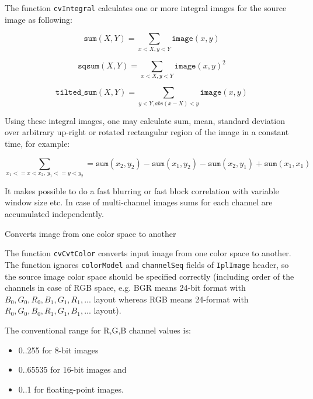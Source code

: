 The function \texttt{cvIntegral} calculates one or more integral images for the source image as following:

\[
\texttt{sum}(X,Y) = \sum_{x<X,y<Y} \texttt{image}(x,y)
\]

\[
\texttt{sqsum}(X,Y) = \sum_{x<X,y<Y} \texttt{image}(x,y)^2
\]

\[
\texttt{tilted\_sum}(X,Y) = \sum_{y<Y,abs(x-X)<y} \texttt{image}(x,y)
\]

Using these integral images, one may calculate sum, mean, standard deviation over arbitrary up-right or rotated rectangular region of the image in a constant time, for example:

\[
\sum_{x_1<=x<x_2, \, y_1<=y<y_2} = \texttt{sum}(x_2,y_2)-\texttt{sum}(x_1,y_2)-\texttt{sum}(x_2,y_1)+\texttt{sum}(x_1,x_1)
\]

It makes possible to do a fast blurring or fast block correlation with variable window size etc. In case of multi-channel images sums for each channel are accumulated independently.

\label{CvtColor}

Converts image from one color space to another


\begin{description}
\end{description}

The function \texttt{cvCvtColor} converts input image from one color
space to another. The function ignores \texttt{colorModel} and
\texttt{channelSeq} fields of \texttt{IplImage} header, so the
source image color space should be specified correctly (including
order of the channels in case of RGB space, e.g. BGR means 24-bit
format with $B_0, G_0, R_0, B_1, G_1, R_1, ...$ layout
whereas RGB means 24-format with $R_0, G_0, B_0, R_1, G_1, B_1, ...$
layout).

The conventional range for R,G,B channel values is:

\begin{itemize}
 \item 0..255 for 8-bit images
 \item 0..65535 for 16-bit images and
 \item 0..1 for floating-point images.
\end{itemize}

